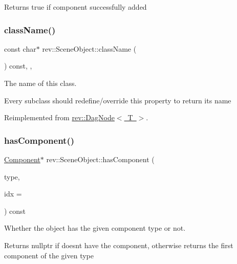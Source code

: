 Returns true if component successfully added \mbox{\label{classrev_1_1_scene_object_a511357629f9d5957355f9a5cec239ec4}} 
\subsubsection{\texorpdfstring{className()}{className()}}
{\footnotesize\ttfamily const char$\ast$ rev\+::\+Scene\+Object\+::class\+Name (\begin{DoxyParamCaption}{ }\end{DoxyParamCaption}) const\hspace{0.3cm}{\ttfamily [inline]}, {\ttfamily [override]}, {\ttfamily [virtual]}}



The name of this class. 

Every subclass should redefine/override this property to return its name 

Reimplemented from \mbox{\hyperlink{classrev_1_1_dag_node_ab769f5f1cc1bdb1dde07c8d1466fad56}{rev\+::\+Dag\+Node$<$ T $>$}}.

\mbox{\label{classrev_1_1_scene_object_a12a80db98267884d135fa7cada3d3194}} 
\subsubsection{\texorpdfstring{hasComponent()}{hasComponent()}}
{\footnotesize\ttfamily \mbox{\hyperlink{classrev_1_1_component}{Component}}$\ast$ rev\+::\+Scene\+Object\+::has\+Component (\begin{DoxyParamCaption}\item[{Component\+Type}]{type,  }\item[{uint32\+\_\+t}]{idx = {} }\end{DoxyParamCaption}) const\hspace{0.3cm}{\ttfamily [inline]}}



Whether the object has the given component type or not. 

Returns nullptr if doesn\textquotesingle{}t have the component, otherwise returns the first component of the given type \mbox{\label{classrev_1_1_scene_object_a63816cdf271b38d1e058c2c2847a0f1e}} 
